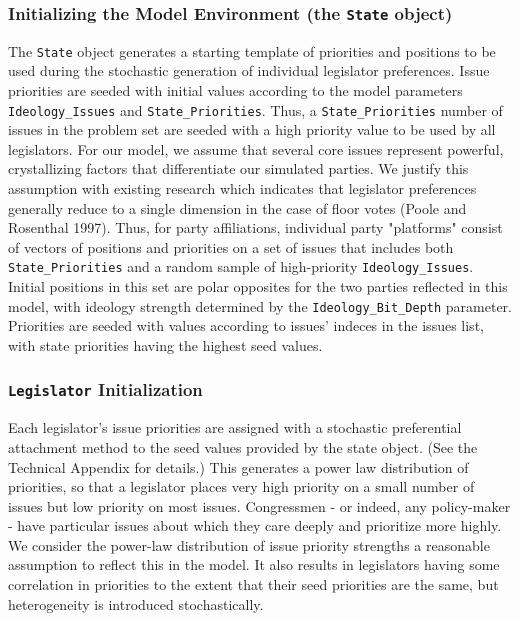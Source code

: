 \documentclass[pdftex,12pt]{llncs}
\begin{document}
\subsubsection{Initializing the Model Environment (the \texttt{State} object)}
The \texttt{State} object generates a starting template of priorities and positions to be used during the stochastic generation of individual legislator preferences.  Issue priorities are seeded with initial values according to the model parameters \texttt{Ideology\_Issues} and \texttt{State\_Priorities}.  Thus, a \texttt{State\_Priorities} number of issues in the problem set are seeded with a high priority value to be used by all legislators.  
For our model, we assume that several core issues represent powerful, crystallizing factors that differentiate our simulated parties.  
We justify this assumption with existing research which indicates that legislator preferences generally reduce to a single dimension in the case of floor votes (Poole and Rosenthal 1997). Thus, for party affiliations, individual party "platforms" consist of vectors of positions and priorities on a set of issues that includes both \texttt{State\_Priorities} and a random sample of high-priority \texttt{Ideology\_Issues}.  Initial positions in this set are polar opposites for the two parties reflected in this model, with ideology strength determined by the \texttt{Ideology\_Bit\_Depth} parameter.  Priorities are seeded with values according to issues' indeces in the issues list, with state priorities having the highest seed values.

\subsubsection{\texttt{Legislator} Initialization}
Each legislator's issue priorities are assigned with a stochastic preferential attachment method to the seed values provided by the state object. (See the Technical Appendix for details.)  
This generates a power law distribution of priorities, so that a legislator places very high priority on a small number of issues but low priority on most issues.  Congressmen - or indeed, any policy-maker - have particular issues about which they care deeply and prioritize more highly.  We consider the power-law distribution of issue priority strengths a reasonable assumption to reflect this in the model.  It also results in legislators having some correlation in priorities to the extent that their seed priorities are the same, but heterogeneity is introduced stochastically.
\end{document}

